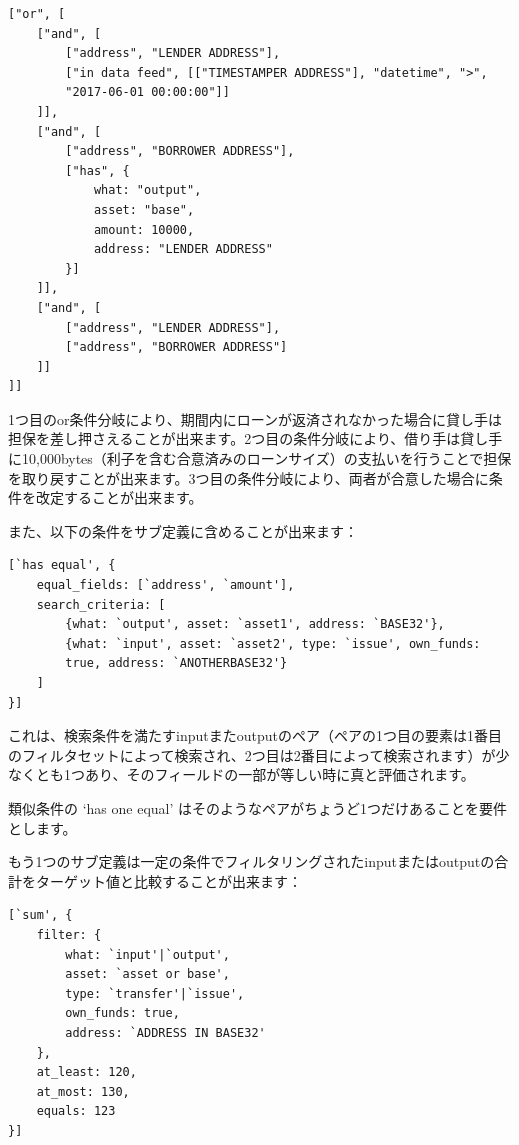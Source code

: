 \documentclass[a4paper, dvipdfmx]{jsarticle}
\begin{document}
\begin{lstlisting}[basicstyle=\ttfamily\footnotesize, frame=none]
["or", [
    ["and", [
        ["address", "LENDER ADDRESS"],
        ["in data feed", [["TIMESTAMPER ADDRESS"], "datetime", ">",
        "2017-06-01 00:00:00"]]
    ]],
    ["and", [
        ["address", "BORROWER ADDRESS"],
        ["has", {
            what: "output",
            asset: "base",
            amount: 10000,
            address: "LENDER ADDRESS"
        }]
    ]],
    ["and", [
        ["address", "LENDER ADDRESS"],
        ["address", "BORROWER ADDRESS"]
    ]]
]]
\end{lstlisting}

\noindent 1つ目のor条件分岐により、期間内にローンが返済されなかった場合に貸し手は担保を差し押さえることが出来ます。2つ目の条件分岐により、借り手は貸し手に10,000bytes（利子を含む合意済みのローンサイズ）の支払いを行うことで担保を取り戻すことが出来ます。3つ目の条件分岐により、両者が合意した場合に条件を改定することが出来ます。

また、以下の条件をサブ定義に含めることが出来ます：

\begin{lstlisting}[basicstyle=\ttfamily\footnotesize, frame=none]
[`has equal', {
    equal_fields: [`address', `amount'],
    search_criteria: [
        {what: `output', asset: `asset1', address: `BASE32'},
        {what: `input', asset: `asset2', type: `issue', own_funds:
        true, address: `ANOTHERBASE32'}
    ]
}]
\end{lstlisting}

\noindent これは、検索条件を満たすinputまたoutputのペア（ペアの1つ目の要素は1番目のフィルタセットによって検索され、2つ目は2番目によって検索されます）が少なくとも1つあり、そのフィールドの一部が等しい時に真と評価されます。

類似条件の ‘has one equal’ はそのようなペアがちょうど1つだけあることを要件とします。

もう1つのサブ定義は一定の条件でフィルタリングされたinputまたはoutputの合計をターゲット値と比較することが出来ます：

\begin{lstlisting}[basicstyle=\ttfamily\footnotesize, frame=none]
[`sum', {
    filter: {
        what: `input'|`output',
        asset: `asset or base',
        type: `transfer'|`issue',
        own_funds: true,
        address: `ADDRESS IN BASE32'
    },
    at_least: 120,
    at_most: 130,
    equals: 123
}]
\end{lstlisting}
\end{document}
